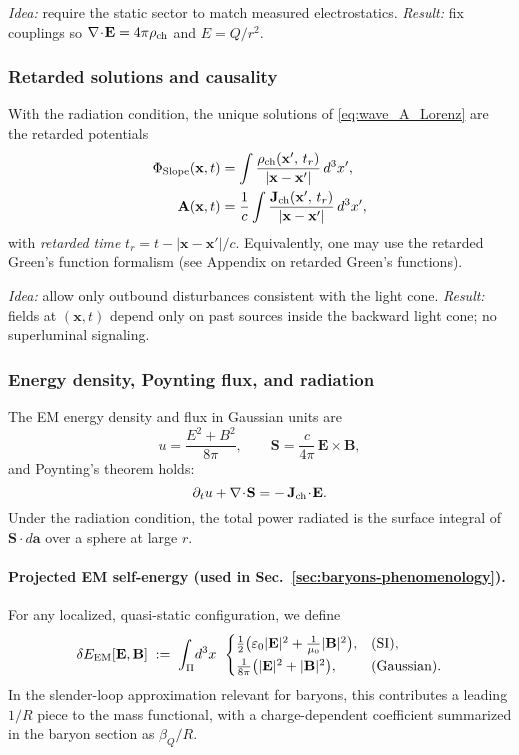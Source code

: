 \noindent\emph{Idea:} require the static sector to match measured electrostatics. \;
\emph{Result:} fix couplings so \(\nabla\!\cdot\!\mathbf E=4\pi\rho_{\rm ch}\) and \(E=Q/r^2\).

\subsubsection{Retarded solutions and causality}
With the radiation condition, the unique solutions of \eqref{eq:wave_A_Lorenz} are the retarded potentials
\begin{align}
\Phi_{\text{Slope}}(\mathbf x,t) &= \int \frac{\rho_{\rm ch}(\mathbf x',\,t_r)}{|\mathbf x-\mathbf x'|}\,d^3x',\\
\mathbf A(\mathbf x,t) &= \frac{1}{c}\int \frac{\mathbf J_{\rm ch}(\mathbf x',\,t_r)}{|\mathbf x-\mathbf x'|}\,d^3x',
\end{align}
with \emph{retarded time} \(t_r=t-|\mathbf x-\mathbf x'|/c\).
Equivalently, one may use the retarded Green's function formalism (see Appendix on retarded Green's functions).

\noindent\emph{Idea:} allow only outbound disturbances consistent with the light cone. \;
\emph{Result:} fields at \((\mathbf x,t)\) depend only on past sources inside the backward light cone; no superluminal signaling.

\subsubsection{Energy density, Poynting flux, and radiation}
The EM energy density and flux in Gaussian units are
\begin{equation}
u = \frac{E^2+B^2}{8\pi}, \qquad \mathbf S = \frac{c}{4\pi}\,\mathbf E\times\mathbf B,
\end{equation}
and Poynting's theorem holds:
\begin{equation}
\partial_t u + \nabla\!\cdot\!\mathbf S = -\,\mathbf J_{\rm ch}\!\cdot\!\mathbf E.
\end{equation}
Under the radiation condition, the total power radiated is the surface integral of \(\mathbf S\cdot d\mathbf a\) over a sphere at large \(r\).

\paragraph{Projected EM self-energy (used in Sec.~\ref{sec:baryons-phenomenology}).}
For any localized, quasi-static configuration, we define
\begin{equation}
\delta E_{\rm EM}[\mathbf E,\mathbf B] \;:=\; \int_{\Pi}\! d^3 x\;\,
\begin{cases}
\tfrac{1}{2}\big(\varepsilon_0 |\mathbf E|^2 + \tfrac{1}{\mu_0}|\mathbf B|^2\big), & \text{(SI)},\\[2pt]
\tfrac{1}{8\pi}\big(|\mathbf E|^2+|\mathbf B|^2\big), & \text{(Gaussian)}.
\end{cases}
\label{eq:deltaE_EM_def}
\end{equation}
In the slender-loop approximation relevant for baryons, this contributes a leading $1/R$ piece to the mass functional, with a charge-dependent coefficient summarized in the baryon section as $\beta_Q/R$.

